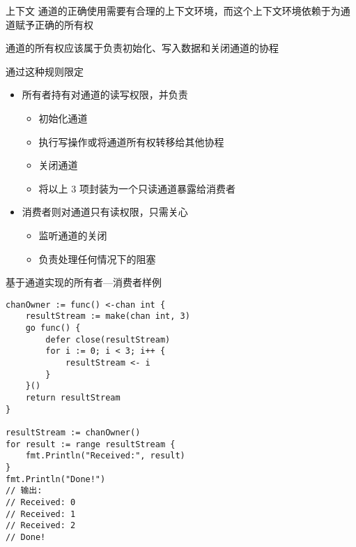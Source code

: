 \begin{frame}{上下文}
    通道的正确使用需要有合理的上下文环境，而这个上下文环境依赖于为通道赋予正确的所有权

    \bigskip
    \alert{通道的所有权应该属于负责初始化、写入数据和关闭通道的协程}
    
    通过这种规则限定
    \begin{itemize}
        \item\pause \alert{所有者}持有对通道的\alert{读写权限}，并负责
            \begin{itemize}
                \item 初始化通道
                \item 执行写操作或将通道所有权转移给其他协程
                \item \alert{关闭通道}
                \item 将以上 3 项封装为一个只读通道暴露给消费者
            \end{itemize}
        \item\pause \alert{消费者}则对通道只有\alert{读权限}，只需关心
            \begin{itemize}
                \item 监听通道的关闭
                \item 负责处理任何情况下的阻塞
            \end{itemize}
    \end{itemize} 
\end{frame}

\begin{frame}[fragile]{基于通道实现的所有者---消费者样例}
\begin{lstlisting}[xleftmargin=8pt]
chanOwner := func() <-chan int {
    resultStream := make(chan int, 3)
    go func() {
        defer close(resultStream)
        for i := 0; i < 3; i++ {
            resultStream <- i
        }
    }()
    return resultStream
}
    
resultStream := chanOwner()
for result := range resultStream {
    fmt.Println("Received:", result)
}
fmt.Println("Done!")
// 输出:
// Received: 0
// Received: 1
// Received: 2
// Done!    
\end{lstlisting}
\end{frame}